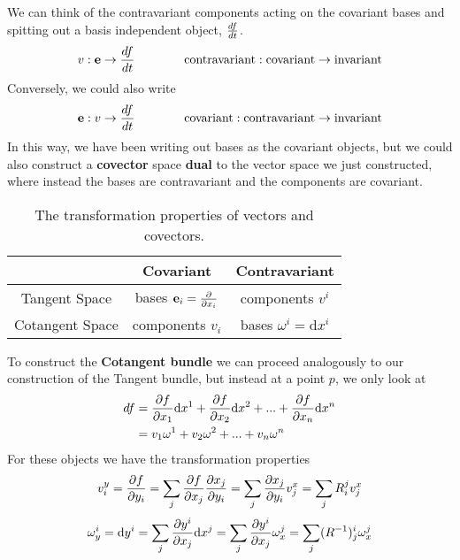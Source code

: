 We can think of the contravariant components acting on the covariant bases and spitting out a basis independent object, $\frac{d f}{d t}$.
\begin{equation}
  v: \mathbf{e} \rightarrow \frac{d f}{d t}   \qquad \qquad
  \text{contravariant} :  \text{covariant}  \rightarrow \text{invariant}
\end{equation}
Conversely, we could also write
\begin{equation}
\mathbf{e} : v \rightarrow \frac{d f}{d t} \qquad \qquad \text{covariant} : \text{contravariant} \rightarrow \text{invariant}
\end{equation}
In this way, we have been writing out bases as the covariant objects, but we could also construct a \textbf{covector} space \textbf{dual} to the vector space we just constructed, where instead the bases are contravariant and the components are covariant.

\begin{table}
  \center
  \def\arraystretch{1.5}
  \begin{tabular}{| c | c | c |}
    \hline
    & Covariant &  Contravariant  \\
    \hline
    Tangent Space & bases $\mathbf{e}_i = \frac{\partial }{\partial x_i}$ & components $v^i$ \\
    Cotangent Space & components $v_i$ & bases $\omega^i = \text{d}x^i$ \\
    \hline
  \end{tabular}
  \caption{The transformation properties of vectors and covectors.}
  \label{tab:trans}
\end{table}

To construct the \textbf{Cotangent bundle} we can proceed analogously to our construction of the Tangent bundle, but instead at a point $p$, we only look at
\begin{align}
  df & = \frac{\partial f}{\partial x_1} \text{d}x^1 + \frac{\partial f}{\partial x_2} \text{d}x^2 + ...
  + \frac{\partial f}{\partial x_n} \text{d}x^n \\
  & = v_1 \omega^1 + v_2 \omega^2 + ... + v_n \omega^n
\end{align}
For these objects we have the transformation properties
\begin{equation}
  v^y_i =\frac{\partial f}{\partial y_i} = \sum_j \frac{\partial f}{\partial x_j} \frac{\partial x_j}{\partial y_i} = \sum_j \frac{\partial x_j}{\partial y_i} v^x_j = \sum_j R^j_i v^x_j
\end{equation}
\begin{equation}
  \omega^i_y = \text{d}y^i = \sum_j \frac{\partial y^i}{\partial x_j} \text{d}x^j =
  \sum_j \frac{\partial y^i}{\partial x_j} \omega^j_x = \sum_j (R^{-1})^i_j \omega^j_x
\end{equation}
